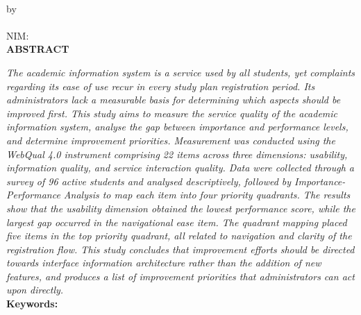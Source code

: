 {}
\begin{center}
    \textbf{\judulen}\\[0.5cm]
    by\\
    \penulis\\
    NIM: \nim\\[1.5em]
    \textbf{ABSTRACT}\\[0.5cm]
\end{center}

\textit{The academic information system is a service used by all students, yet
complaints regarding its ease of use recur in every study plan registration
period. Its administrators lack a measurable basis for determining which aspects
should be improved first. This study aims to measure the service quality of the
academic information system, analyse the gap between importance and performance
levels, and determine improvement priorities. Measurement was conducted using
the WebQual 4.0 instrument comprising 22 items across three dimensions:
usability, information quality, and service interaction quality. Data were
collected through a survey of 96 active students and analysed descriptively,
followed by Importance-Performance Analysis to map each item into four priority
quadrants. The results show that the usability dimension obtained the lowest
performance score, while the largest gap occurred in the navigational ease item.
The quadrant mapping placed five items in the top priority quadrant, all related
to navigation and clarity of the registration flow. This study concludes that
improvement efforts should be directed towards interface information
architecture rather than the addition of new features, and produces a list of
improvement priorities that administrators can act upon directly.}\\[0.6cm]

\noindent \textbf{Keywords:} \textit{\keywords}
\clearpage
